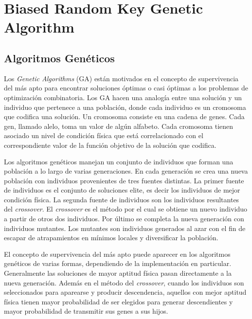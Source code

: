 
\chapter{Biased Random Key Genetic Algorithm}

\section{Algoritmos Genéticos}

Los \textit{Genetic Algorithms} (GA) \cite{Goldberg} están motivados en el concepto de supervivencia del más apto para encontrar soluciones óptimas o casi óptimas a los problemas de optimización combinatoria. Los GA hacen una analogía entre una solución y un individuo que pertenece a una población, donde cada individuo es un cromosoma que codifica una solución. Un cromosoma consiste en una cadena de genes. Cada gen, llamado alelo, toma un valor de algún alfabeto. Cada cromosoma tienen asociado un nivel de condición física que está correlacionado con el correspondiente valor de la función objetivo de la solución que codifica. 

\bigskip

Los algoritmos genéticos manejan un conjunto de individuos que forman una población a lo largo de varias generaciones. En cada generación se crea una nueva población con individuos provenientes de tres fuentes distintas. La primer fuente de individuos es el conjunto de soluciones elite, es decir los individuos de mejor condición física. La segunda fuente de individuos son los individuos resultantes del \textit{crossover}. El \textit{crossover} es el método por el cual se obtiene un nuevo individuo a partir de otros dos individuos. Por último se completa la nueva generación con individuos mutantes. Los mutantes son individuos generados al azar con el fin de escapar de atrapamientos en mínimos locales y diversificar la población. 

\bigskip

El concepto de supervivencia del más apto puede aparecer en los algoritmos genéticos de varias formas, dependiendo de la implementación en particular. Generalmente las soluciones de mayor aptitud física pasan directamente a la nueva generación. Además en el método del \textit{crossover}, cuando los individuos son seleccionados para aparearse y producir descendencia, aquellos con mejor aptitud física tienen mayor probabilidad de ser elegidos para generar descendientes y mayor probabilidad de transmitir sus genes a sus hijos.

